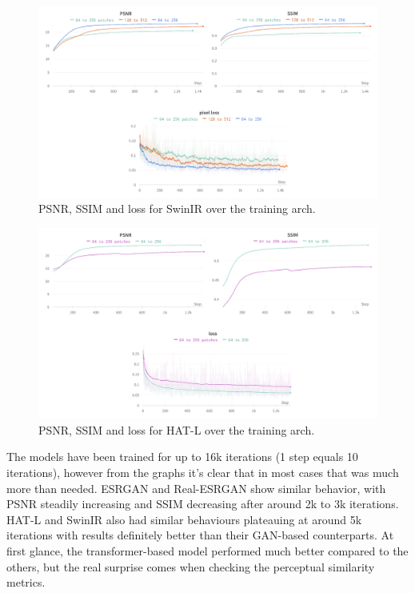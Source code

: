 \begin{figure}[H]
  \centering
  \includegraphics[scale=0.8]{figures/SwinIR_compose.png}
  \caption{PSNR, SSIM and loss for SwinIR over the training arch.}
  \label{img:swinir_training}
\end{figure}

\begin{figure}[H]
  \centering
  \includegraphics[scale=0.8]{figures/HATL_compose.png}
  \caption{PSNR, SSIM and loss for HAT-L over the training arch.}
  \label{img:hat_training}
\end{figure}

The models have been trained for up to 16k iterations (1 step equals 10 iterations), however from the graphs it's clear that in most cases that was much more than needed. ESRGAN and Real-ESRGAN show similar behavior, with PSNR steadily increasing and SSIM decreasing after around 2k to 3k iterations. HAT-L and SwinIR also had similar behaviours plateauing at around 5k iterations with results definitely better than their GAN-based counterparts. At first glance, the transformer-based model performed much better compared to the others, but the real surprise comes when checking the perceptual similarity metrics.

